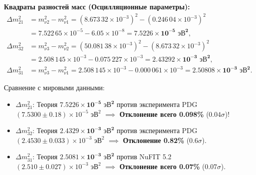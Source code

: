 \documentclass[11pt,a4paper]{article}
\theoremstyle{definition}
\theoremstyle{remark}
\begin{document}
\textbf{Квадраты разностей масс (Осцилляционные параметры):}
\begin{align}
	\Delta m_{21}^2 &= m_{\nu 2}^2 - m_{\nu 1}^2 = (8.673\,32 \times 10^{-3})^2 - (0.246\,04 \times 10^{-3})^2 \nonumber \\
	&= 7.522\,65 \times 10^{-5} - 6.05 \times 10^{-8} = \mathbf{7.5226 \times 10^{-5} \text{ эВ}^2}, \\
	\Delta m_{32}^2 &= m_{\nu 3}^2 - m_{\nu 2}^2 = (50.081\,38 \times 10^{-3})^2 - (8.673\,32 \times 10^{-3})^2 \nonumber \\
	&= 2.508\,145 \times 10^{-3} - 0.075\,227 \times 10^{-3} = \mathbf{2.43292 \times 10^{-3} \text{ эВ}^2}, \\
	\Delta m_{31}^2 &= m_{\nu 3}^2 - m_{\nu 1}^2 = 2.508\,145 \times 10^{-3} - 0.000\,061 \times 10^{-3} = \mathbf{2.50808 \times 10^{-3} \text{ эВ}^2}.
\end{align}

Сравнение с мировыми данными:
\begin{itemize}
	\item $\Delta m_{21}^2$: Теория $\mathbf{7.5226 \times 10^{-5} \text{ эВ}^2}$ против эксперимента PDG $(7.5300 \pm 0.18) \times 10^{-5} \text{ эВ}^2$ $\implies$ \textbf{Отклонение всего 0.098\%} ($0.04\sigma$)!
	\item $\Delta m_{32}^2$: Теория $\mathbf{2.4329 \times 10^{-3} \text{ эВ}^2}$ против эксперимента PDG $(2.4530 \pm 0.033) \times 10^{-3} \text{ эВ}^2$ $\implies$ \textbf{Отклонение 0.82\%} ($0.6\sigma$).
	\item $\Delta m_{31}^2$: Теория $\mathbf{2.5081 \times 10^{-3} \text{ эВ}^2}$ против NuFIT 5.2 $(2.510 \pm 0.027) \times 10^{-3} \text{ эВ}^2$ $\implies$ \textbf{Отклонение всего 0.07\%} ($0.07\sigma$).
\end{itemize}
\end{document}

